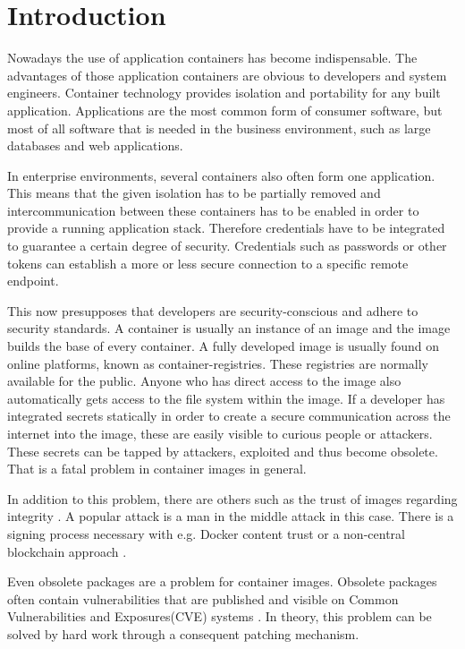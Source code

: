 \chapter{Introduction}
\label{ch:intro}

Nowadays the use of application containers has become indispensable. The advantages of those application containers are obvious to developers and system engineers. Container technology provides isolation and portability for any built application. Applications are the most common form of consumer software, but most of all software that is needed in the business environment, such as large databases and web applications.

In enterprise environments, several containers also often form one application. This means that the given isolation has to be partially removed and intercommunication between these containers has to be enabled in order to provide a running application stack. Therefore credentials have to be integrated to guarantee a certain degree of security. Credentials such as passwords or other tokens can establish a more or less secure connection to a specific remote endpoint. 

This now presupposes that developers are security-conscious and adhere to security standards. A container is usually an instance of an image and the image builds the base of every container. A fully developed image is usually found on online platforms, known as container-registries. These registries are normally available for the public. Anyone who has direct access to the image also automatically gets access to the file system within the image. If a developer has integrated secrets statically in order to create a secure communication across the internet into the image, these are easily visible to curious people or attackers. These secrets can be tapped by attackers, exploited and thus become obsolete. That is a fatal problem in container images in general.

In addition to this problem, there are others such as the trust of images regarding integrity \cite{to_docker_or_not}.
A popular attack is a man in the middle attack in this case. There is a signing process necessary with e.g. Docker content trust or a non-central blockchain approach \cite{Xu2018}. 

Even obsolete packages are a problem for container images. Obsolete packages often contain vulnerabilities that are published and visible on Common Vulnerabilities and Exposures(CVE) systems \cite{10.1007/978-3-319-94289-6_8}. In theory, this problem can be solved by hard work through a consequent patching mechanism. 

